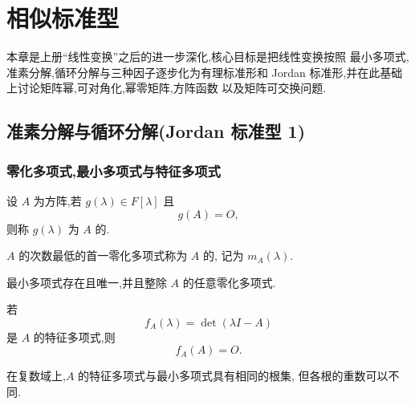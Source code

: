 \setcounter{chapter}{5}
\pagestyle{fancy}

\chapter{相似标准型}

本章是上册``线性变换''之后的进一步深化,核心目标是把线性变换按照
最小多项式,准素分解,循环分解与三种因子逐步化为有理标准形和
Jordan 标准形,并在此基础上讨论矩阵幂,可对角化,幂零矩阵,方阵函数
以及矩阵可交换问题.

\section{准素分解与循环分解(Jordan 标准型 1)}

\subsection{零化多项式,最小多项式与特征多项式}

\begin{definition}
设 $A$ 为方阵,若 $g(\lambda)\in F[\lambda]$ 且
\[
g(A)=O,
\]
则称 $g(\lambda)$ 为 $A$ 的.
\end{definition}

\begin{definition}
$A$ 的次数最低的首一零化多项式称为 $A$ 的,
记为 $m_A(\lambda)$.
\end{definition}

\begin{theorem}[\markstar]
最小多项式存在且唯一,并且整除 $A$ 的任意零化多项式.
\end{theorem}

\begin{theorem}
若
\[
f_A(\lambda)=\det(\lambda I-A)
\]
是 $A$ 的特征多项式,则
\[
f_A(A)=O.
\]
\end{theorem}

\begin{theorem}[\markstar]
在复数域上,$A$ 的特征多项式与最小多项式具有相同的根集,
但各根的重数可以不同.
\end{theorem}


